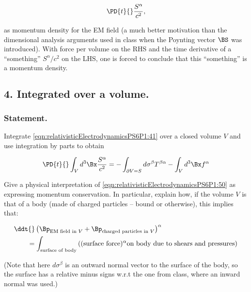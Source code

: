 \begin{equation}\label{eqn:relativisticElectrodynamicsPS6P1:203}
\PD{t}{} \frac{S^\alpha}{c^2},
\end{equation}

as momentum density for the EM field (a much better motivation than the dimensional analysis arguments used in class when the Poynting vector $\BS$ was introduced).  With force per volume on the RHS and the time derivative of a ``something'' $S^\alpha/c^2$ on the LHS, one is forced to conclude that this ``something'' is a momentum density.

\subsection{4. Integrated over a volume.}

\subsubsection{Statement.}

Integrate \ref{eqn:relativisticElectrodynamicsPS6P1:41} over a closed volume $V$ and use integration by parts to obtain

\begin{equation}\label{eqn:relativisticElectrodynamicsPS6P1:50}
\PD{t}{} \int_V d^3 \Bx \frac{S^\alpha}{c^2} 
= 
- \int_{\partial V = S} d \sigma^\beta T^{\beta \alpha} - \int_V d^3 \Bx f^\alpha 
\end{equation}

Give a physical interpretation of \ref{eqn:relativisticElectrodynamicsPS6P1:50} as expressing momentum conservation.  In particular, explain how, if the volume $V$ is that of a body (made of charged particles -- bound or otherwise), this implies that:

\begin{equation}\label{eqn:relativisticElectrodynamicsPS6P1:60}
\begin{aligned}
&\ddt{} \left( 
\Bp_{\text{EM field in $V$}} + 
\Bp_{\text{charged particles in $V$}} 
\right)^\alpha \\
&\qquad = \int_{\text{surface of body}} \left( 
(\text{surface force})^\alpha \text{on body due to shears and pressures}
\right)
\end{aligned}
\end{equation}

(Note that here $d \sigma^\beta$ is an outward normal vector to the surface of the body, so the surface has a relative minus signs w.r.t the one from class, where an inward normal was used.)

